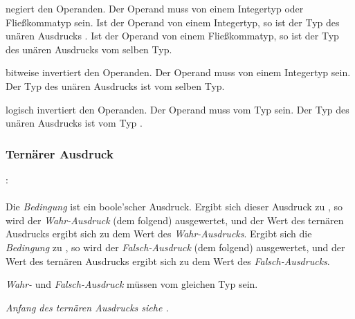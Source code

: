 \op{-} negiert den Operanden. Der Operand muss von einem Integertyp oder Fließkommatyp sein.
Ist der Operand von einem Integertyp, so ist der Typ des unären Ausdrucks .
Ist der Operand von einem Fließkommatyp, so ist der Typ des unären Ausdrucks vom selben Typ.

\op{$\sim$} bitweise invertiert den Operanden. Der Operand muss von einem Integertyp sein. Der Typ des unären Ausdrucks ist vom selben Typ.

\op{!} logisch invertiert den Operanden. Der Operand muss vom Typ  sein. Der Typ des unären Ausdrucks ist vom Typ .

\subsubsection{Ternärer Ausdruck}\label{Ternaerer Ausdruck}
:\label{asdr_ternaer_suffix}\\
\hspace*{1cm}\glq{}\grq  {}  \glq\Gt{:}\grq  {} \\

Die \emph{Bedingung} ist ein boole'scher Ausdruck. Ergibt sich dieser Ausdruck zu ,
so wird der \emph{Wahr-Ausdruck} (dem  folgend) ausgewertet, und der Wert des ternären
Ausdrucks ergibt sich zu dem Wert des \emph{Wahr-Ausdrucks}.
Ergibt sich die \emph{Bedingung} zu , so wird der \emph{Falsch-Ausdruck} (dem \kw{:} folgend)
ausgewertet, und der Wert des ternären
Ausdrucks ergibt sich zu dem Wert des \emph{Falsch-Ausdrucks}.

\emph{Wahr-} und \emph{Falsch-Ausdruck} müssen vom gleichen Typ sein.

\emph{Anfang des ternären Ausdrucks siehe .}


